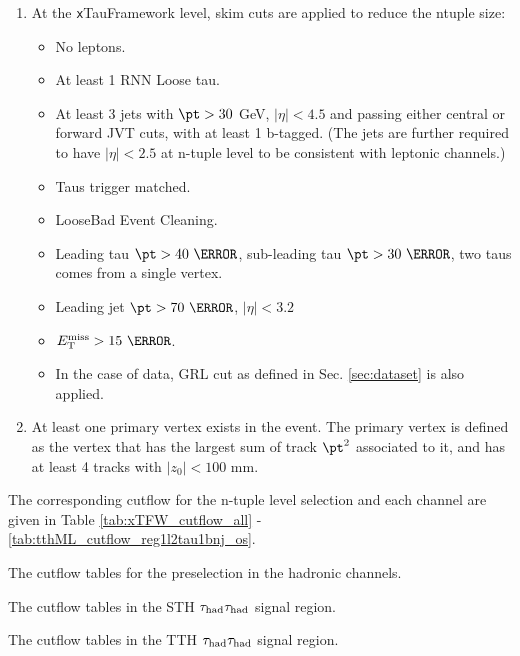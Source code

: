 \begin{enumerate}
\item At the {\texttt xTauFramework} level, skim cuts are applied to reduce the ntuple size:
  \begin{itemize}
  \item No leptons.
  \item At least 1 RNN Loose tau.
  \item At least 3 jets with $\pt>30$ GeV, $|\eta|<4.5$ and passing either central or forward JVT cuts, with at least 1 b-tagged. (The jets are further required to have $|\eta|<2.5$ at n-tuple level to be consistent with leptonic channels.)
  \item Taus trigger matched.
  \item LooseBad Event Cleaning.
  \item Leading tau $\pt>40~\GeV$, sub-leading tau $\pt>30~\GeV$, two taus comes from a single vertex.
  \item Leading jet $\pt>70~\GeV$, $|\eta|<3.2$
  \item $\met>15~\GeV$.
  \item In the case of data, GRL cut as defined in Sec. \ref{sec:dataset} is also applied.
  \end{itemize}

\item At least one primary vertex exists in the event. The primary vertex is defined as the vertex that has the largest sum of track $\pt^2$ associated to it, and has at least 4 tracks with $|z_0|<100$ mm.
\end{enumerate}

The corresponding cutflow for the n-tuple level selection and each channel are given in Table \ref{tab:xTFW_cutflow_all} - \ref{tab:tthML_cutflow_reg1l2tau1bnj_os}.
\begin{table}
\caption{The cutflow tables for the preselection in the hadronic channels.}
\label{tab:xTFW_cutflow_all}
\footnotesize

\end{table}

\begin{table}
\caption{The cutflow tables in the STH $\tau_\text{had}{}\tau_\text{had}$ signal region.}
\label{tab:cutflow_STHhadhad}

\end{table}

\begin{table}
\caption{The cutflow tables in the TTH $\tau_\text{had}{}\tau_\text{had}$ signal region.}
\label{tab:cutflow_TTHhadhad}

\end{table}

